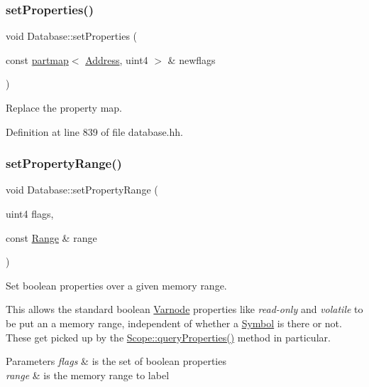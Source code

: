 \subsubsection{\texorpdfstring{setProperties()}{setProperties()}}
{\footnotesize\ttfamily void Database\+::set\+Properties (\begin{DoxyParamCaption}\item[{const \mbox{\hyperlink{classpartmap}{partmap}}$<$ \mbox{\hyperlink{class_address}{Address}}, uint4 $>$ \&}]{newflags }\end{DoxyParamCaption})\hspace{0.3cm}{\ttfamily [inline]}}



Replace the property map. 



Definition at line 839 of file database.\+hh.

\mbox{\label{class_database_aca0311269bfa73f5673c998dec92bb95}} 
\subsubsection{\texorpdfstring{setPropertyRange()}{setPropertyRange()}}
{\footnotesize\ttfamily void Database\+::set\+Property\+Range (\begin{DoxyParamCaption}\item[{uint4}]{flags,  }\item[{const \mbox{\hyperlink{class_range}{Range}} \&}]{range }\end{DoxyParamCaption})}



Set boolean properties over a given memory range. 

This allows the standard boolean \mbox{\hyperlink{class_varnode}{Varnode}} properties like {\itshape read-\/only} and {\itshape volatile} to be put an a memory range, independent of whether a \mbox{\hyperlink{class_symbol}{Symbol}} is there or not. These get picked up by the \mbox{\hyperlink{class_scope_a1b8c2c2302eba2666e319a4c18a67d51}{Scope\+::query\+Properties()}} method in particular. 
\begin{DoxyParams}{Parameters}
{\em flags} & is the set of boolean properties \\
\hline
{\em range} & is the memory range to label \\
\hline
\end{DoxyParams}



